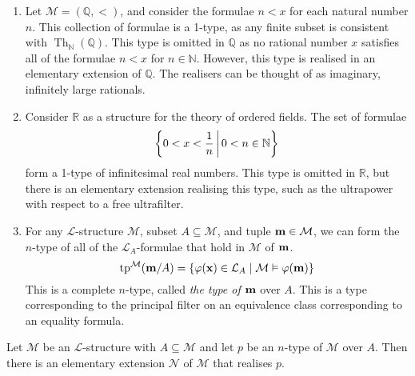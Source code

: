 \begin{example}
    \begin{enumerate}
        \item Let \( \mathcal M = (\mathbb Q, <) \), and consider the formulae \( n < x \) for each natural number \( n \).
        This collection of formulae is a 1-type, as any finite subset is consistent with \( \operatorname{Th}_{\mathbb N}(\mathbb Q) \).
        This type is omitted in \( \mathbb Q \) as no rational number \( x \) satisfies all of the formulae \( n < x \) for \( n \in \mathbb N \).
        However, this type is realised in an elementary extension of \( \mathbb Q \).
        The realisers can be thought of as imaginary, infinitely large rationals.
        \item Consider \( \mathbb R \) as a structure for the theory of ordered fields.
        The set of formulae
        \[ \qty{0 < x < \frac{1}{n} \,\middle|\,0 < n \in \mathbb N} \]
        form a 1-type of infinitesimal real numbers.
        This type is omitted in \( \mathbb R \), but there is an elementary extension realising this type, such as the ultrapower with respect to a free ultrafilter.
        \item For any \( \mathcal L \)-structure \( \mathcal M \), subset \( A \subseteq \mathcal M \), and tuple \( \vb m \in \mathcal M \), we can form the \( n \)-type of all of the \( \mathcal L_A \)-formulae that hold in \( \mathcal M \) of \( \vb m \).
        \[ \operatorname{tp}^{\mathcal M}(\vb m/A) = \qty{\varphi(\vb x) \in \mathcal L_A \mid \mathcal M \vDash \varphi(\vb m)} \]
        This is a complete \( n \)-type, called \emph{the type of \( \vb m \)} over \( A \).
        This is a type corresponding to the principal filter on an equivalence class corresponding to an equality formula.
    \end{enumerate}
\end{example}
\begin{proposition}
    Let \( \mathcal M \) be an \( \mathcal L \)-structure with \( A \subseteq \mathcal M \) and let \( p \) be an \( n \)-type of \( \mathcal M \) over \( A \).
    Then there is an elementary extension \( \mathcal N \) of \( \mathcal M \) that realises \( p \).
\end{proposition}
